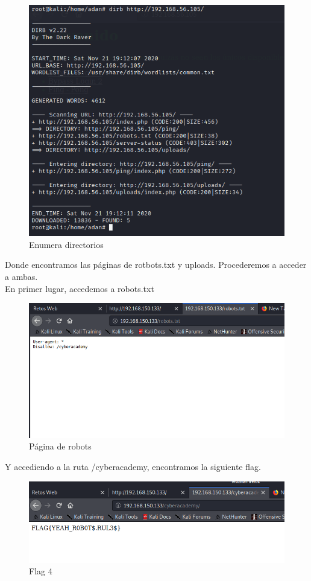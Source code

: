 \documentclass[12pt,twoside]{article}
\begin{document}
\begin{figure}[h]
    \centering
    \includegraphics[scale=0.55]{./imagenes/enumera_directorios}
    \caption{Enumera directorios}
\end{figure}

Donde encontramos las páginas de rotbots.txt y uploads. Procederemos a acceder a ambas.\\
En primer lugar, accedemos a robots.txt
\begin{figure}[h]
    \centering
    \includegraphics[scale=0.5]{./imagenes/robots_txt}
    \caption{Página de robots}
\end{figure}

Y accediendo a la ruta /cyberacademy, encontramos la siguiente flag.

\begin{figure}[h]
    \centering
    \includegraphics[scale=0.5]{./imagenes/robots_txt_flag}
    \caption{Flag 4}
\end{figure}
\end{document}
